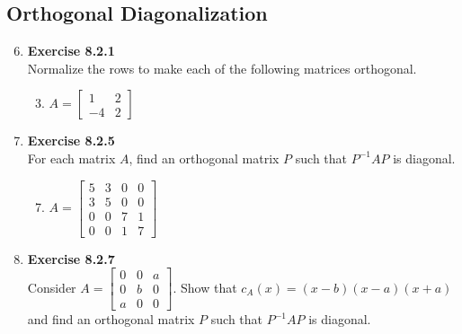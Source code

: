 \documentclass[12pt, a4paper]{scrartcl}
\begin{document}
    \subsection*{Orthogonal Diagonalization}
        \begin{enumerate}
            \setcounter{enumi}{5}
            \item \textbf{Exercise 8.2.1}\\Normalize the rows to make each of the following matrices orthogonal.
            \begin{enumerate}
                \setcounter{enumii}{2}
                \item $A = \begin{bmatrix}
                    1 & 2\\
                    -4 & 2
                \end{bmatrix}$

            \end{enumerate}
            
            \item \textbf{Exercise 8.2.5}\\For each matrix $A$, find an orthogonal matrix $P$ such that $P^{-1}AP$ is diagonal.
            \begin{enumerate}
                \setcounter{enumii}{6}
                \item $A = \begin{bmatrix}
                    5&3&0&0\\
                    3&5&0&0\\
                    0&0&7&1\\
                    0&0&1&7
                \end{bmatrix}$

            \end{enumerate}
            
            \item \textbf{Exercise 8.2.7}\\Consider $A = \begin{bmatrix}
                0&0&a\\
                0&b&0\\
                a&0&0
            \end{bmatrix}$. Show that $c_A(x)=(x-b)(x-a)(x+a)$ and find an orthogonal matrix $P$ such that $P^{-1}AP$ is diagonal.
            
        \end{enumerate}
\end{document}

